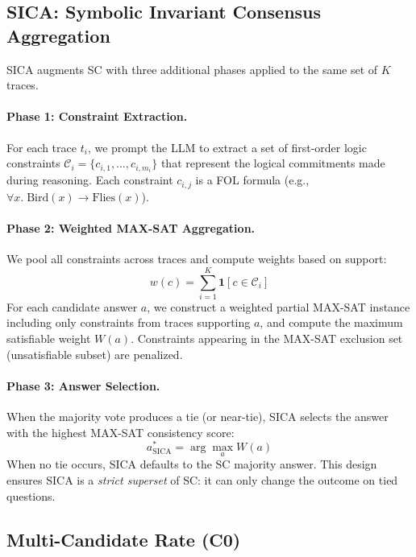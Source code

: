 \documentclass[11pt,a4paper]{article}
\begin{document}
\subsection{SICA: Symbolic Invariant Consensus Aggregation}

SICA augments SC with three additional phases applied to the same set of $K$ traces.

\paragraph{Phase 1: Constraint Extraction.}
For each trace $t_i$, we prompt the LLM to extract a set of first-order logic constraints $\mathcal{C}_i = \{c_{i,1}, \ldots, c_{i,m_i}\}$ that represent the logical commitments made during reasoning. Each constraint $c_{i,j}$ is a FOL formula (e.g., $\forall x.\; \text{Bird}(x) \rightarrow \text{Flies}(x)$).

\paragraph{Phase 2: Weighted MAX-SAT Aggregation.}
We pool all constraints across traces and compute weights based on support:
\begin{equation}
    w(c) = \sum_{i=1}^{K} \mathbf{1}[c \in \mathcal{C}_i]
\end{equation}
For each candidate answer $a$, we construct a weighted partial MAX-SAT instance including only constraints from traces supporting $a$, and compute the maximum satisfiable weight $W(a)$. Constraints appearing in the MAX-SAT exclusion set (unsatisfiable subset) are penalized.

\paragraph{Phase 3: Answer Selection.}
When the majority vote produces a tie (or near-tie), SICA selects the answer with the highest MAX-SAT consistency score:
\begin{equation}
    a^*_{\text{SICA}} = \arg\max_{a} W(a)
\end{equation}
When no tie occurs, SICA defaults to the SC majority answer. This design ensures SICA is a \emph{strict superset} of SC: it can only change the outcome on tied questions.

\subsection{Multi-Candidate Rate (C0)}
\end{document}
